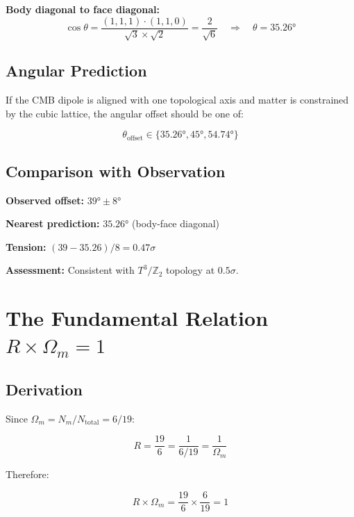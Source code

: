 \documentclass[12pt,a4paper]{article}
\begin{document}
\textbf{Body diagonal to face diagonal:}
\begin{equation}
\cos\theta = \frac{(1,1,1) \cdot (1,1,0)}{\sqrt{3} \times \sqrt{2}} = \frac{2}{\sqrt{6}} \quad \Rightarrow \quad \theta = 35.26°
\end{equation}

\subsection{Angular Prediction}

If the CMB dipole is aligned with one topological axis and matter is constrained by the cubic lattice, the angular offset should be one of:

\begin{equation}
\boxed{\theta_{\text{offset}} \in \{35.26°, 45°, 54.74°\}}
\end{equation}

\subsection{Comparison with Observation}

\textbf{Observed offset:} $39° \pm 8°$

\textbf{Nearest prediction:} $35.26°$ (body-face diagonal)

\textbf{Tension:} $(39 - 35.26)/8 = 0.47\sigma$

\textbf{Assessment:} Consistent with $T^3/\mathbb{Z}_2$ topology at $0.5\sigma$.

\section{The Fundamental Relation $R \times \Omega_m = 1$}

\subsection{Derivation}

Since $\Omega_m = N_m / N_{\text{total}} = 6/19$:

\begin{equation}
R = \frac{19}{6} = \frac{1}{6/19} = \frac{1}{\Omega_m}
\end{equation}

Therefore:

\begin{equation}
\boxed{R \times \Omega_m = \frac{19}{6} \times \frac{6}{19} = 1}
\end{equation}
\end{document}
